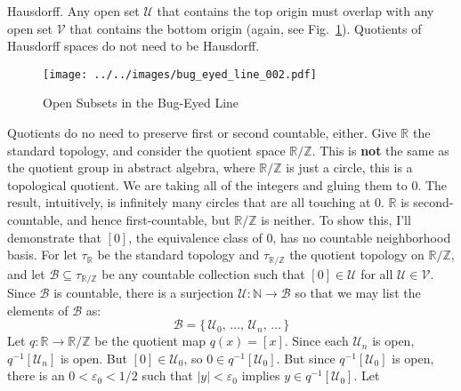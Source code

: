 \documentclass{article}
\theoremstyle{plain}
\theoremstyle{normal}
\begin{document}
        Hausdorff. Any open set $\mathcal{U}$ that contains the top origin must
        overlap with any open set $\mathcal{V}$ that contains the bottom
        origin (again, see Fig.~\ref{fig:bug_eyed_line_002}). Quotients of
        Hausdorff spaces do not need to be Hausdorff.
        \begin{figure}
            \centering
            \texttt{[image: ../../images/bug\_eyed\_line\_002.pdf]}
            \caption{Open Subsets in the Bug-Eyed Line}
            \label{fig:bug_eyed_line_002}
        \end{figure}
        \par\hfill\par
        Quotients do no need to preserve first or second countable, either.
        Give $\mathbb{R}$ the standard topology, and consider the quotient space
        $\mathbb{R}/\mathbb{Z}$. This is \textbf{not} the same as the quotient
        group in abstract algebra, where $\mathbb{R}/\mathbb{Z}$ is just a
        circle, this is a topological quotient. We are taking all of the
        integers and gluing them to $0$. The result, intuitively, is infinitely
        many circles that are all touching at $0$. $\mathbb{R}$ is
        second-countable, and hence first-countable, but $\mathbb{R}/\mathbb{Z}$
        is neither. To show this, I'll demonstrate that $[0]$, the equivalence
        class of $0$, has no countable neighborhood basis. For let
        $\tau_{\mathbb{R}}$ be the standard topology and
        $\tau_{\mathbb{R}/\mathbb{Z}}$ the quotient topology on
        $\mathbb{R}/\mathbb{Z}$, and let
        $\mathcal{B}\subseteq\tau_{\mathbb{R}/\mathbb{Z}}$ be any countable
        collection such that $[0]\in\mathcal{U}$ for all
        $\mathcal{U}\in\mathcal{V}$. Since $\mathcal{B}$ is countable, there
        is a surjection $\mathcal{U}:\mathbb{N}\rightarrow\mathcal{B}$ so
        that we may list the elements of $\mathcal{B}$ as:
        \begin{equation}
            \mathcal{B}=
            \{\,\mathcal{U}_{0},\,\dots,\,\mathcal{U}_{n},\,\dots\,\}
        \end{equation}
        Let $q:\mathbb{R}\rightarrow\mathbb{R}/\mathbb{Z}$ be the quotient
        map $q(x)=[x]$. Since each $\mathcal{U}_{n}$ is open,
        $q^{-1}[\mathcal{U}_{n}]$ is open. But $[0]\in\mathcal{U}_{0}$, so
        $0\in{q}^{-1}[\mathcal{U}_{0}]$. But since $q^{-1}[\mathcal{U}_{0}]$ is
        open, there is an $0<\varepsilon_{0}<1/2$ such that
        $|y|<\varepsilon_{0}$ implies $y\in{q}^{-1}[\mathcal{U}_{0}]$. Let
\end{document}
